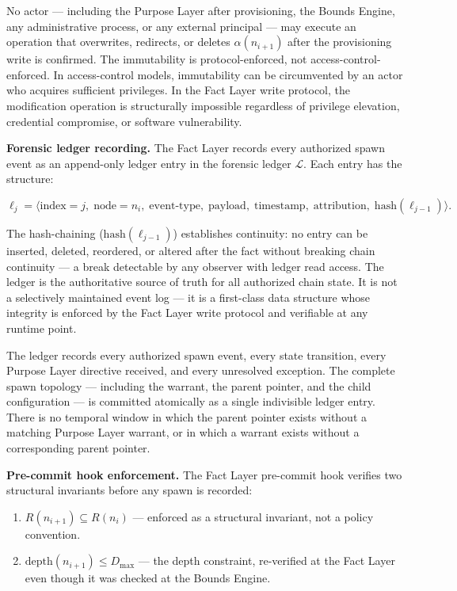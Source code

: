 No actor — including the Purpose Layer after provisioning, the Bounds Engine, any administrative process, or any external principal — may execute an operation that overwrites, redirects, or deletes $\alpha(n_{i+1})$ after the provisioning write is confirmed. The immutability is protocol-enforced, not access-control-enforced. In access-control models, immutability can be circumvented by an actor who acquires sufficient privileges. In the Fact Layer write protocol, the modification operation is structurally impossible regardless of privilege elevation, credential compromise, or software vulnerability.

\medskip
\noindent\textbf{Forensic ledger recording.} The Fact Layer records every authorized spawn event as an append-only ledger entry in the forensic ledger $\mathcal{L}$. Each entry has the structure:

\begin{equation}
\ell_j = \bigl\langle
\text{index}=j,\;
\text{node}=n_i,\;
\text{event-type},\;
\text{payload},\;
\text{timestamp},\;
\text{attribution},\;
\text{hash}(\ell_{j-1})
\bigr\rangle .
\label{eq:ledger-entry}
\end{equation}

The hash-chaining ($\text{hash}(\ell_{j-1})$) establishes continuity: no entry can be inserted, deleted, reordered, or altered after the fact without breaking chain continuity — a break detectable by any observer with ledger read access. The ledger is the authoritative source of truth for all authorized chain state. It is not a selectively maintained event log — it is a first-class data structure whose integrity is enforced by the Fact Layer write protocol and verifiable at any runtime point.

The ledger records every authorized spawn event, every state transition, every Purpose Layer directive received, and every unresolved exception. The complete spawn topology — including the warrant, the parent pointer, and the child configuration — is committed atomically as a single indivisible ledger entry. There is no temporal window in which the parent pointer exists without a matching Purpose Layer warrant, or in which a warrant exists without a corresponding parent pointer.

\medskip
\noindent\textbf{Pre-commit hook enforcement.} The Fact Layer pre-commit hook verifies two structural invariants before any spawn is recorded:

\begin{enumerate}
    \item[(FC1)] $R(n_{i+1}) \subseteq R(n_i)$ — enforced as a structural invariant, not a policy convention.
    \item[(FC2)] $\text{depth}(n_{i+1}) \leq D_{\max}$ — the depth constraint, re-verified at the Fact Layer even though it was checked at the Bounds Engine.
\end{enumerate}

